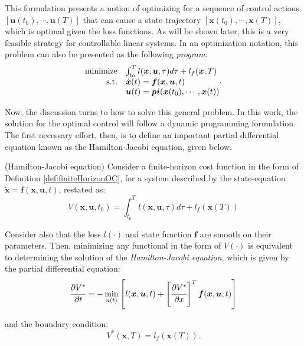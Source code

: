 \documentclass[a4paper,11pt]{book}
\numberwithin{figure}{chapter}
\numberwithin{equation}{chapter}
\numberwithin{table}{chapter}
\newtheorem{theorem}{Theorem}[chapter]
\theoremstyle{definition}
\newcounter{boxed-theorem}
\newenvironment{boxed-theorem}[1]
{\colorlet{shadecolor}{pastelBlue2!5} \begin{shaded} \begin{theorem}{#1}}
{\end{theorem} \end{shaded}}
\newcounter{boxed-lemma}
\newcounter{boxed-definition}
\newcounter{boxed-example}
\begin{document}
This formulation presents a notion of optimizing for a sequence of control actions $[\bm{u}(t_0), \cdots, \bm{u}(T)]$ that can cause a state trajectory $[\bm{x}(t_0), \cdots, \bm{x}(T)]$, which is optimal given the loss functions. As will be shown later, this is a very feasible strategy for controllable linear systems. In an optimization notation, this problem can also be presented as the following \textit{program}: 
\begin{align}
\begin{matrix*}[l]
    \text{minimize} & \int_{t_0}^T l(\bm{x}, \bm{u}, \tau) d \tau + l_f(\bm{x}, T) \\
    \hfill \text{s.t.} & \dot{\bm{x}}(t) = \bm{f}(\bm{x}, \bm{u}, t)  \\
                & \bm{u}(t) = \bm{pi}(\bm{x}(t_0), \cdots, \bm{x}(t))
\end{matrix*}
.\end{align}

Now, the discussion turns to how to solve this general problem. In this work, the solution for the optimal control will follow a dynamic programming formulation. The first necessary effort, then, is to define an important partial differential equation known as the Hamilton-Jacobi equation, given below.

\begin{boxed-theorem}{(Hamilton-Jacobi equation)} \label{th:hamiltonJacobi}
    Consider a finite-horizon cost function in the form of Definition \ref{def:finiteHorizonOC}, for a system described by the state-equation $\dot{\bm{x}} = \bm{f}(\bm{x}, \bm{u}, t)$, restated as:
    \begin{equation} \label{eq:valueCostFunctional}
    	V(\bm{x}, \bm{u}, t_0) = \int_{t_0}^T l(\bm{x}, \bm{u}, \tau) d \tau + l_f(\bm{x}(T))
    \end{equation}
    
    \noindent Consider also that the loss $l(\cdot)$ and state function $\bm{f}$ are smooth on their parameters. Then, minimizing any functional in the form of $V(\cdot)$ is equivalent to determining the solution of the \textit{Hamilton-Jacobi equation}, which is given by the partial differential equation:
    \begin{equation} \label{eq:HJEquation}
        \cfrac{\partial V^*}{\partial t} = - \min_{u(t)} \left[ l(\bm{x}, \bm{u}, t) + \left[ \cfrac{\partial V^*}{\partial x} \right]^T \bm{f}(\bm{x}, \bm{u}, t)  \right]
    \end{equation}
    
    \noindent and the boundary condition:
    \begin{equation}
        V^*(\bm{x}, T) = l_f(\bm{x}(T))
    .\end{equation}
\end{boxed-theorem}
\end{document}
